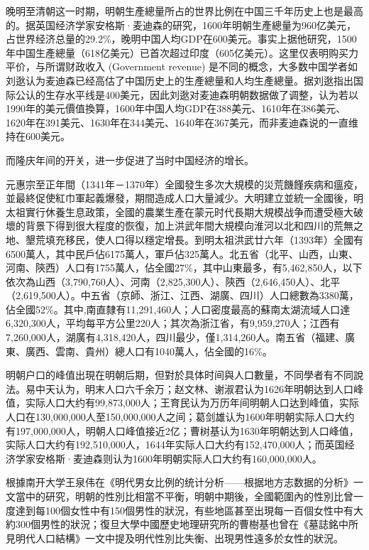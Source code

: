 晚明至清朝这一时期，明朝生產總量所占的世界比例在中国三千年历史上也是最高的。据英国经济学家安格斯·麦迪森的研究，1600年明朝生產總量为960亿美元，占世界经济总量的29.2\%，晚明中国人均GDP在600美元。事实上据他研究，1500年中国生產總量（618亿美元）已首次超过印度（605亿美元）。这里仅表明购买力平价，与所谓财政收入 (Government revenue) 是不同的概念，大多数中国学者如刘逖认为麦迪森已经高估了中国历史上的生產總量和人均生產總量。据刘逖指出国际公认的生存水平线是400美元，因此刘逖对麦迪森明朝数据做了调整，认为若以1990年的美元價值換算，1600年中国人均GDP在388美元、1610年在386美元、1620年在391美元、1630年在344美元、1640年在367美元，而非麦迪森说的一直维持在600美元。

而隆庆年间的开关，进一步促进了当时中国经济的增长。

元惠宗至正年間（1341年－1370年）全國發生多次大規模的災荒饑饉疾病和瘟疫，並最終促使紅巾軍起義爆發，期間造成人口大量減少。大明建立並統一全國後，明太祖實行休養生息政策，全國的農業生產在蒙元时代長期大規模战争而遭受極大破壞的背景下得到很大程度的恢復，加上洪武年間大規模向淮河以北和四川的荒無之地、墾荒填充移民，使人口得以穩定增長。到明太祖洪武廿六年（1393年）全國有6500萬人，其中民戶佔6175萬人，軍戶佔325萬人。北五省（北平、山西，山東、河南、陝西）人口有1755萬人，佔全國27\%，其中山東最多，有5,462,850人，以下依次為山西（3,790,760人）、河南（2,825,300人）、陝西（2,646,450人）、北平（2,619,500人）。中五省（京師、浙江、江西、湖廣、四川）人口總數為3380萬，佔全國52\%。其中,南直隸有11,291,460人；人口密度最高的蘇南太湖流域人口達6,320,300人，平均每平方公里220人；其次為浙江省，有9,959,270人；江西有7,260,000人，湖廣有4,318,420人，四川最少，僅1,314,260人。南五省（福建、廣東、廣西、雲南、貴州）總人口有1040萬人，佔全國的16\%。

明朝户口的峰值出現在明朝后期，但對於具体时间與人口數量，不同學者有不同說法。易中天认为，明末人口六千余万；赵文林、谢淑君认为1626年明朝达到人口峰值，实际人口大约有99,873,000人；王育民认为万历年间明朝人口达到峰值，实际人口在130,000,000人至150,000,000人之间；葛剑雄认为1600年明朝实际人口大约有197,000,000人，明朝人口峰值接近2亿；曹树基认为1630年明朝达到人口峰值，实际人口大约有192,510,000人，1644年实际人口大约有152,470,000人；而英国经济学家安格斯·麦迪森则认为1600年明朝实际人口大约有160,000,000人。

根據南开大学王泉伟在《明代男女比例的统计分析——根据地方志数据的分析》一文當中的研究，明朝的性別比相當不平衡，明朝中期後，全國範圍內的性別比曾一度達到每100個女性中有150個男性的狀況，有些地區甚至出現每一百個女性中有大約300個男性的狀況；復旦大學中國歷史地理研究所的曹樹基也曾在《墓誌銘中所見明代人口結構》一文中提及明代性別比失衡、出現男性遠多於女性的狀況。

